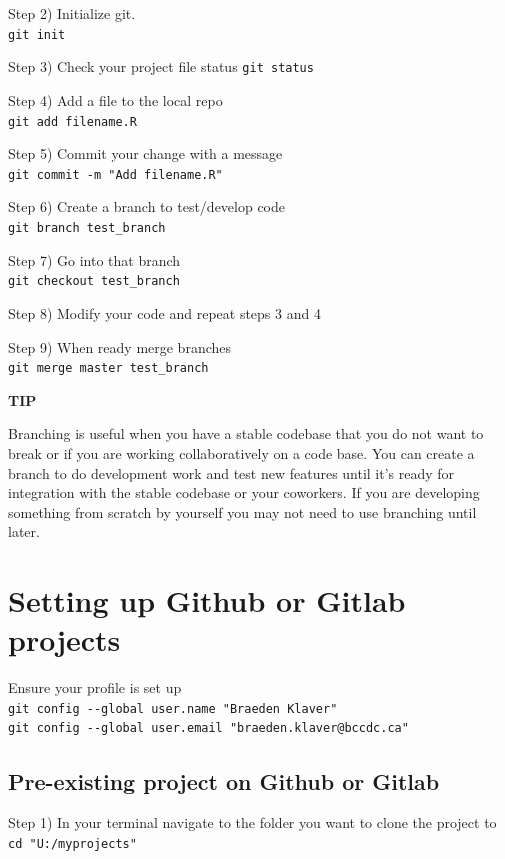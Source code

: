 \documentclass[
]{book}
\begin{document}
Step 2) Initialize git.\\
\texttt{git\ init}

Step 3) Check your project file status
\texttt{git\ status}

Step 4) Add a file to the local repo\\
\texttt{git\ add\ filename.R}

Step 5) Commit your change with a message\\
\texttt{git\ commit\ -m\ "Add\ filename.R"}

Step 6) Create a branch to test/develop code\\
\texttt{git\ branch\ test\_branch}

Step 7) Go into that branch\\
\texttt{git\ checkout\ test\_branch}

Step 8) Modify your code and repeat steps 3 and 4

Step 9) When ready merge branches\\
\texttt{git\ merge\ master\ test\_branch}

\textbf{TIP}

Branching is useful when you have a stable codebase that you do not want to break or if you are working collaboratively on a code base. You can create a branch to do development work and test new features until it's ready for integration with the stable codebase or your coworkers. If you are developing something from scratch by yourself you may not need to use branching until later.

\hypertarget{setting-up-github-or-gitlab-projects}{%
\section{Setting up Github or Gitlab projects}\label{setting-up-github-or-gitlab-projects}}

Ensure your profile is set up\\
\texttt{git\ config\ -\/-global\ user.name\ "Braeden\ Klaver"}~\\
\texttt{git\ config\ -\/-global\ user.email\ "braeden.klaver@bccdc.ca"}

\hypertarget{pre-existing-project-on-github-or-gitlab}{%
\subsection{Pre-existing project on Github or Gitlab}\label{pre-existing-project-on-github-or-gitlab}}

Step 1) In your terminal navigate to the folder you want to clone the project to\\
\texttt{cd\ "U:/myprojects"}
\end{document}
